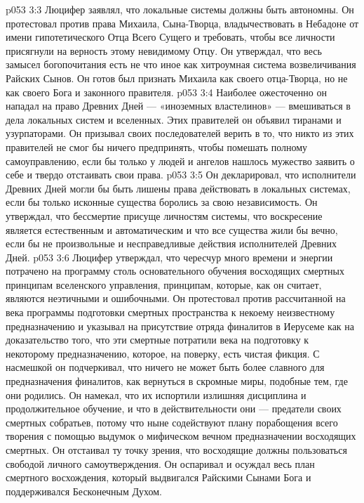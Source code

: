 \vs p053 3:3 \bibnobreakspace {} Люцифер заявлял, что локальные системы должны быть автономны. Он протестовал против права Михаила, Сына\hyp{}Творца, владычествовать в Небадоне от имени гипотетического Отца Всего Сущего и требовать, чтобы все личности присягнули на верность этому невидимому Отцу. Он утверждал, что весь замысел богопочитания есть не что иное как хитроумная система возвеличивания Райских Сынов. Он готов был признать Михаила как своего отца\hyp{}Творца, но не как своего Бога и законного правителя.
\vs p053 3:4 Наиболее ожесточенно он нападал на право Древних Дней --- «иноземных властелинов» --- вмешиваться в дела локальных систем и вселенных. Этих правителей он объявил тиранами и узурпаторами. Он призывал своих последователей верить в то, что никто из этих правителей не смог бы ничего предпринять, чтобы помешать полному самоуправлению, если бы только у людей и ангелов нашлось мужество заявить о себе и твердо отстаивать свои права.
\vs p053 3:5 Он декларировал, что исполнители Древних Дней могли бы быть лишены права действовать в локальных системах, если бы только исконные существа боролись за свою независимость. Он утверждал, что бессмертие присуще личностям системы, что воскресение является естественным и автоматическим и что все существа жили бы вечно, если бы не произвольные и несправедливые действия исполнителей Древних Дней.
\vs p053 3:6 \bibnobreakspace {} Люцифер утверждал, что чересчур много времени и энергии потрачено на программу столь основательного обучения восходящих смертных принципам вселенского управления, принципам, которые, как он считает, являются неэтичными и ошибочными. Он протестовал против рассчитанной на века программы подготовки смертных пространства к некоему неизвестному предназначению и указывал на присутствие отряда финалитов в Иерусеме как на доказательство того, что эти смертные потратили века на подготовку к некоторому предназначению, которое, на поверку, есть чистая фикция. С насмешкой он подчеркивал, что ничего не может быть более славного для предназначения финалитов, как вернуться в скромные миры, подобные тем, где они родились. Он намекал, что их испортили излишняя дисциплина и продолжительное обучение, и что в действительности они --- предатели своих смертных собратьев, потому что ныне содействуют плану порабощения всего творения с помощью выдумок о мифическом вечном предназначении восходящих смертных. Он отстаивал ту точку зрения, что восходящие должны пользоваться свободой личного самоутверждения. Он оспаривал и осуждал весь план смертного восхождения, который выдвигался Райскими Сынами Бога и поддерживался Бесконечным Духом.
